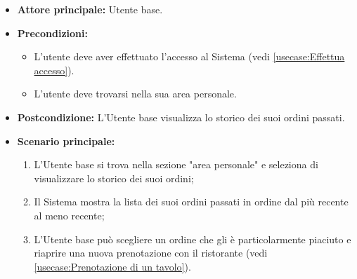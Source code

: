 \label{usecase:Storico ordini}
\begin{itemize}
	\item \textbf{Attore principale:} Utente base.

	\item \textbf{Precondizioni:}
	\begin{itemize}
        \item L'utente deve aver effettuato l'accesso al Sistema (vedi \autoref{usecase:Effettua accesso}).
        \item L'utente deve trovarsi nella sua area personale.
    \end{itemize}

	\item \textbf{Postcondizione:} L'Utente base visualizza lo storico dei suoi ordini passati.

	\item \textbf{Scenario principale:}
	      \begin{enumerate}
		      \item L'Utente base si trova nella sezione "area personale" e seleziona di visualizzare lo storico dei suoi ordini;
		      \item Il Sistema mostra la lista dei suoi ordini passati in ordine dal più recente al meno recente;
              \item L'Utente base può scegliere un ordine che gli è particolarmente piaciuto e riaprire una nuova prenotazione con il ristorante (vedi \autoref{usecase:Prenotazione di un tavolo}).
	      \end{enumerate}
\end{itemize}
